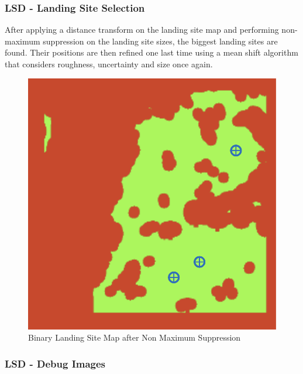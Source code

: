 \subsubsection{LSD - Landing Site Selection}

After applying a distance transform on the landing site map and performing non-maximum suppression on the landing site sizes, the biggest landing sites are found. Their positions are then refined one last time using a mean shift algorithm that considers roughness, uncertainty and size once again. 

\begin{figure}[ht!]
    \centering
    \includegraphics[scale=0.5]{images/setup/ls_map_nms.png}
    \caption{Binary Landing Site Map after Non Maximum Suppression}
    \label{fig:ls_map_nps}
\end{figure}

\clearpage %

\subsubsection{LSD - Debug Images}

